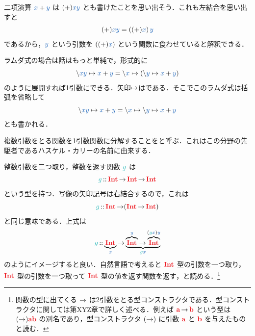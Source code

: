 \documentclass[a5paper,twoside,fleqn,draft]{jsbook}
\begin{document}
二項演算 $\hVar{x}+\hVar{y}$ は $(+)\hVar{x}\hVar{y}$ とも書けたことを思い出そう．これも左結合を思い出すと
\begin{equation}
  (+)\hVar{x}\hVar{y}
  =\left((+)\hVar{x}\right)\hVar{y}
\end{equation}
であるから，$\hVar{y}$ という引数を $\left((+)\hVar{x}\right)$ という関数に食わせていると解釈できる．

ラムダ式の場合は話はもっと単純で，形式的に
\begin{equation}
  \hLambdaSyntax{\hVar{x}\hVar{y}}{\hVar{x}+\hVar{y}}
  =\hLambdaSyntax{\hVar{x}}{\left(\hLambdaSyntax{\hVar{y}}{\hVar{x}+\hVar{y}}\right)}
\end{equation}
のように展開すれば1引数にできる．矢印$\mapsto$はである．そこでこのラムダ式は括弧を省略して
\begin{equation}
  \hLambdaSyntax{\hVar{x}\hVar{y}}{\hVar{x}+\hVar{y}}
  =\hLambda\hVar{x}\hLambdaArrow\hLambda\hVar{y}\hLambdaArrow\hVar{x}+\hVar{y}
\end{equation}
とも書かれる．

複数引数をとる関数を1引数関数に分解することをと呼ぶ．これはこの分野の先駆者であるハスケル・カリーの名前に由来する．


整数引数を二つ取り，整数を返す関数 $\hFunc{g}$ は
\begin{equation}
  \hFunc{g}
  \hIsTypeOf\hInt\hFunctionArrow\hInt\hFunctionArrow\hInt
\end{equation}
という型を持つ．写像の矢印記号は右結合するので，これは
\begin{equation}
  \hFunc{g}
  \hIsTypeOf\hInt\hFunctionArrow(\hInt\hFunctionArrow\hInt)
\end{equation}
と同じ意味である．上式は
\begin{equation*}
  \hFunc{g}
  \hIsTypeOf\underbrace{\hInt}_{\hVar{x}}
  \hFunctionArrow\underbrace{\overbrace{\hInt}^{\hVar{y}}\hFunctionArrow\overbrace{\hInt}^{(\hFunc{g}\hVar{x})\hVar{y}}}_{\hFunc{g}\hVar{x}}
\end{equation*}
のようにイメージすると良い．自然言語で考えると $\hInt$ 型の引数を一つ取り，$\hInt$ 型の引数を一つ取って $\hInt$ 型の値を返す関数を返す，と読める．\footnote{関数の型に出てくる $\operatorname{\rightarrow}$ は2引数をとる型コンストラクタである．型コンストラクタに関しては第XYZ章で詳しく述べる．例えば $\hTypeName{a}\hFunctionArrow\hTypeName{b}$ という型は $(\hFunctionArrow)\hTypeName{a}\hTypeName{b}$ の別名であり，型コンストラクタ $(\operatorname{\rightarrow})$ に引数 $\hTypeName{a}$ と $\hTypeName{b}$ を与えたものと読む．}
\end{document}
